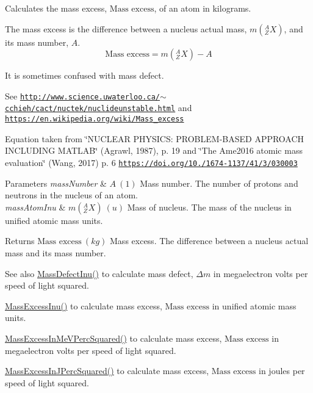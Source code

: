 Calculates the mass excess, $\text{Mass excess}$, of an atom in kilograms. 

The mass excess is the difference between a nucleus actual mass, $m({^A_ZX})$, and its mass number, $A$. \[\text{Mass excess} = m({^A_ZX}) - A\]

It is sometimes confused with mass defect.

See \href{http://www.science.uwaterloo.ca/~cchieh/cact/nuctek/nuclideunstable.html}{\tt http\+://www.\+science.\+uwaterloo.\+ca/$\sim$cchieh/cact/nuctek/nuclideunstable.\+html} and \href{https://en.wikipedia.org/wiki/Mass_excess}{\tt https\+://en.\+wikipedia.\+org/wiki/\+Mass\+\_\+excess}

Equation taken from \char`\"{}\+N\+U\+C\+L\+E\+A\+R P\+H\+Y\+S\+I\+C\+S\+: P\+R\+O\+B\+L\+E\+M-\/\+B\+A\+S\+E\+D A\+P\+P\+R\+O\+A\+C\+H I\+N\+C\+L\+U\+D\+I\+N\+G M\+A\+T\+L\+A\+B\char`\"{} (Agrawl, 1987), p. 19 and \char`\"{}\+The Ame2016 atomic mass evaluation\char`\"{} (Wang, 2017) p. 6 \href{https://doi.org/10.1088/1674-1137/41/3/030003}{\tt https\+://doi.\+org/10./1674-\/1137/41/3/030003}


\begin{DoxyParams}{Parameters}
{\em mass\+Number} & $A\ (1)$ Mass number. The number of protons and neutrons in the nucleus of an atom. \\
\hline
{\em mass\+Atom\+Inu} & $m({^A_ZX})\ (u)$ Mass of nucleus. The mass of the nucleus in unified atomic mass units. \\
\hline
\end{DoxyParams}
\begin{DoxyReturn}{Returns}
$\text{Mass excess}\ (kg)$ Mass excess. The difference between a nucleus actual mass and its mass number. 
\end{DoxyReturn}
\begin{DoxySeeAlso}{See also}
\mbox{\hyperlink{group___e_g_x_phys-_mass_defect_ga70400004a5cb622de372ab84670731ef}{Mass\+Defect\+Inu()}} to calculate mass defect, $\Delta m$ in megaelectron volts per speed of light squared. 

\mbox{\hyperlink{group___e_g_x_phys-_mass_excess_ga61c6f557bd742126c0c76e88cf7740ad}{Mass\+Excess\+Inu()}} to calculate mass excess, $\text{Mass excess}$ in unified atomic mass units. 

\mbox{\hyperlink{group___e_g_x_phys-_mass_excess_ga99a93b88df3425b7a153c32c05fa5a88}{Mass\+Excess\+In\+Me\+V\+Perc\+Squared()}} to calculate mass excess, $\text{Mass excess}$ in megaelectron volts per speed of light squared. 

\mbox{\hyperlink{group___e_g_x_phys-_mass_excess_ga3eb487f438543e950b9c5aece4c5b409}{Mass\+Excess\+In\+J\+Perc\+Squared()}} to calculate mass excess, $\text{Mass excess}$ in joules per speed of light squared. 
\end{DoxySeeAlso}
\mbox{\label{group___e_g_x_phys-_mass_excess_ga99a93b88df3425b7a153c32c05fa5a88}} 
